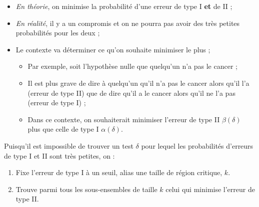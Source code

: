 \documentclass[10pt, french]{article}
\begin{document}
\begin{multicols*}{2}
\begin{center}
\end{center}

\begin{itemize}
	\item	\textit{En théorie}, on minimise la probabilité d'une erreur de type I \textbf{et} de II ; 
	\item	\textit{En réalité}, il y a un compromis et on ne pourra pas avoir des très petites probabilités pour les deux ;
	\item	Le contexte va déterminer ce qu'on souhaite minimiser le plus ;
		\begin{itemize}
		\item	Par exemple, soit l'hypothèse nulle que quelqu'un n'a pas le cancer ;
		\item	Il est plus grave de dire à quelqu'un qu'il n'a pas le cancer alors qu'il l'a (erreur de type II) que de dire qu'il a le cancer alors qu'il ne l'a pas (erreur de type I) ;
		\item	Dans ce contexte, on souhaiterait minimiser l'erreur de type II $\beta(\delta)$ plus que celle de type I $\alpha(\delta)$.
		\end{itemize}
\end{itemize}

Puisqu'il est impossible de trouver un test $\delta$ pour lequel les probabilités d'erreurs de type I et II sont très petites, on :
\begin{enumerate}
	\item	Fixe l'erreur de type I à un seuil, alias une taille de région critique, $k$.
	\item	Trouve parmi tous les sous-ensembles de taille $k$ celui qui minimise l'erreur de type II.
\end{enumerate}


\end{multicols*}
\end{document}
